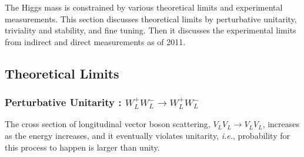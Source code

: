 The Higgs mass is constrained by various theoretical limits 
and experimental measurements. This section discusses theoretical 
limits by perturbative unitarity, triviality and stability, 
and fine tuning. Then it discusses the experimental limits 
from indirect and direct measurements as of 2011. 


\subsection{Theoretical Limits} 

\subsubsection{Perturbative Unitarity : $W_L^+W_L^- \rightarrow W_L^+W_L^-$}

The cross section of longitudinal vector boson scattering, $V_LV_L \to V_LV_L$, 
increases as the energy increases, and it eventually violates unitarity, 
\textit{i.e.}, probability for this process to happen is larger than unity. 

